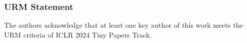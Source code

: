 \subsubsection*{URM Statement}
The authors acknowledge that at least one key author of this work meets the URM criteria of ICLR 2024 Tiny Papers Track.
